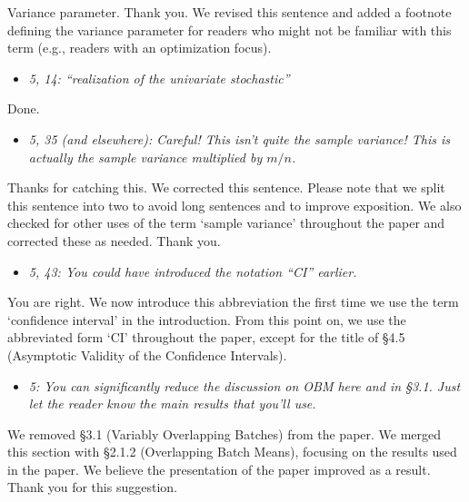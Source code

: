 \documentclass[11pt,notitlepage,onecolumn]{article}
\newcommand{\noi}{\noindent}
\begin{document}
\noi
Variance parameter. 
Thank you.
We revised this sentence and added a footnote defining the variance parameter for readers who might not be familiar with this term (e.g., readers with an optimization focus). 
\medskip 



\begin{itemize}
\item[] \textit{5, 14: ``realization of the univariate stochastic''}
\end{itemize}

\noi
Done.  
\medskip 


\begin{itemize}
\item[] \textit{5, 35 (and elsewhere): Careful! This isn't quite the sample variance! This is actually the sample variance multiplied by $m/n$.}
\end{itemize}

\noi
Thanks for catching this. 
We corrected this sentence. 
Please note that we split this sentence into two to avoid long sentences and to improve exposition. 
We also checked for other uses of the term `sample variance' throughout the paper and corrected these as needed.
Thank you.  
\medskip 


\begin{itemize}
\item[] \textit{5, 43: You could have introduced the notation ``CI'' earlier.}
\end{itemize}

\noi
You are right. 
We now introduce this abbreviation the first time we use the term `confidence interval' in the introduction. 
From this point on, we use the abbreviated form `CI' throughout the paper, except for the title of \S 4.5 (Asymptotic Validity of the Confidence Intervals). 
\medskip 



\begin{itemize}
\item[] \textit{5: You can significantly reduce the discussion on OBM here and in \S 3.1. 
Just let the reader know the main results that you'll use.}
\end{itemize}

\noi
We removed \S 3.1 (Variably Overlapping Batches) from the paper. 
We merged this section with \S 2.1.2 (Overlapping Batch Means), focusing on the results used in the paper. 
We believe the presentation of the paper improved as a result. 
Thank you for this suggestion. 
\medskip 
\end{document}

